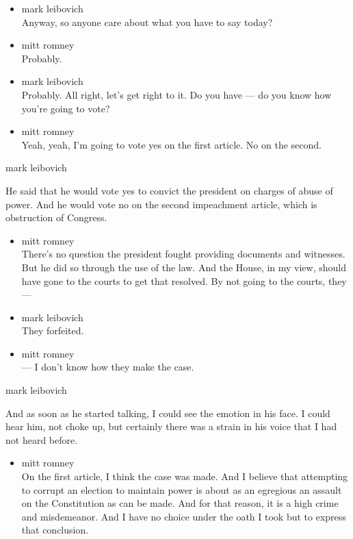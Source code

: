 \begin{itemize}
\item
  mark leibovich\\
  Anyway, so anyone care about what you have to say today?
\item
  mitt romney\\
  Probably.
\item
  mark leibovich\\
  Probably. All right, let's get right to it. Do you have --- do you
  know how you're going to vote?
\item
  mitt romney\\
  Yeah, yeah, I'm going to vote yes on the first article. No on the
  second.
\end{itemize}

mark leibovich

He said that he would vote yes to convict the president on charges of
abuse of power. And he would vote no on the second impeachment article,
which is obstruction of Congress.

\begin{itemize}
\item
  mitt romney\\
  There's no question the president fought providing documents and
  witnesses. But he did so through the use of the law. And the House, in
  my view, should have gone to the courts to get that resolved. By not
  going to the courts, they ---
\item
  mark leibovich\\
  They forfeited.
\item
  mitt romney\\
  --- I don't know how they make the case.
\end{itemize}

mark leibovich

And as soon as he started talking, I could see the emotion in his face.
I could hear him, not choke up, but certainly there was a strain in his
voice that I had not heard before.

\begin{itemize}
\tightlist
\item
  mitt romney\\
  On the first article, I think the case was made. And I believe that
  attempting to corrupt an election to maintain power is about as an
  egregious an assault on the Constitution as can be made. And for that
  reason, it is a high crime and misdemeanor. And I have no choice under
  the oath I took but to express that conclusion.
\end{itemize}

